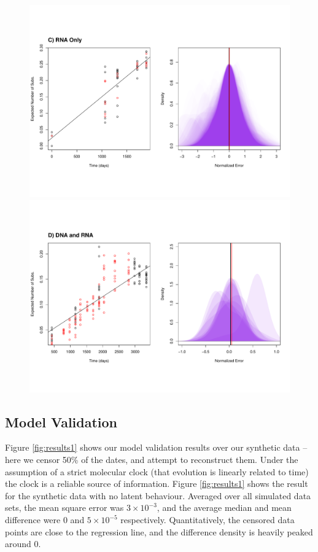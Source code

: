 \begin{figure} \label{fig:res}
	\centering
	\includegraphics[trim=0cm 0cm 0cm 7cm, clip=true,scale=0.425]{figures/ancre.pdf}\\
	\includegraphics[trim=0cm 4cm 0cm 7cm, clip=true,scale=0.425]{figures/lanl.pdf}
	\caption[Examples]{}
\end{figure}


\subsection{Model Validation} \label{sec:sim_results}
Figure \ref{fig:results1} shows our model validation results over our synthetic data -- here we censor 50\% of the dates, and attempt to reconstruct them. 
Under the assumption of a strict molecular clock (that evolution is linearly related to time) the clock is a reliable source of information.
Figure \ref{fig:results1} shows the result for the synthetic data with no latent behaviour.
Averaged over all simulated data sets, the mean square error was $3\times 10^{-3}$, and the average median and mean difference were 0 and $5\times 10^{-5}$ respectively. 
Quantitatively, the censored data points are close to the regression line, and the difference density is heavily peaked around 0. 


